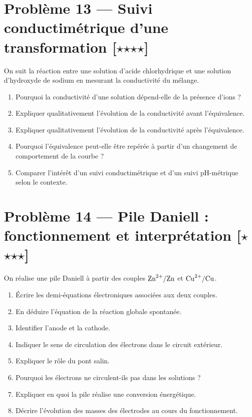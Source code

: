 \documentclass[11pt,a4paper]{article}
\newcommand{\etoile}{\ensuremath{\star}}
\begin{document}
\section*{Problème 13 --- Suivi conductimétrique d'une transformation \hfill [\etoile\etoile\etoile\etoile]}

On suit la réaction entre une solution d'acide chlorhydrique et une solution d'hydroxyde de sodium en mesurant la conductivité du mélange.

\begin{enumerate}[label=\arabic*)]
    \item Pourquoi la conductivité d'une solution dépend-elle de la présence d'ions ?
    \item Expliquer qualitativement l'évolution de la conductivité avant l'équivalence.
    \item Expliquer qualitativement l'évolution de la conductivité après l'équivalence.
    \item Pourquoi l'équivalence peut-elle être repérée à partir d'un changement de comportement de la courbe ?
    \item Comparer l'intérêt d'un suivi conductimétrique et d'un suivi pH-métrique selon le contexte.
\end{enumerate}

\section*{Problème 14 --- Pile Daniell : fonctionnement et interprétation \hfill [\etoile\etoile\etoile\etoile]}

On réalise une pile Daniell à partir des couples $\ce{Zn^{2+}/Zn}$ et $\ce{Cu^{2+}/Cu}$.

\begin{enumerate}[label=\arabic*)]
    \item Écrire les demi-équations électroniques associées aux deux couples.
    \item En déduire l'équation de la réaction globale spontanée.
    \item Identifier l'anode et la cathode.
    \item Indiquer le sens de circulation des électrons dans le circuit extérieur.
    \item Expliquer le rôle du pont salin.
    \item Pourquoi les électrons ne circulent-ils pas dans les solutions ?
    \item Expliquer en quoi la pile réalise une conversion énergétique.
    \item Décrire l'évolution des masses des électrodes au cours du fonctionnement.
\end{enumerate}
\end{document}

